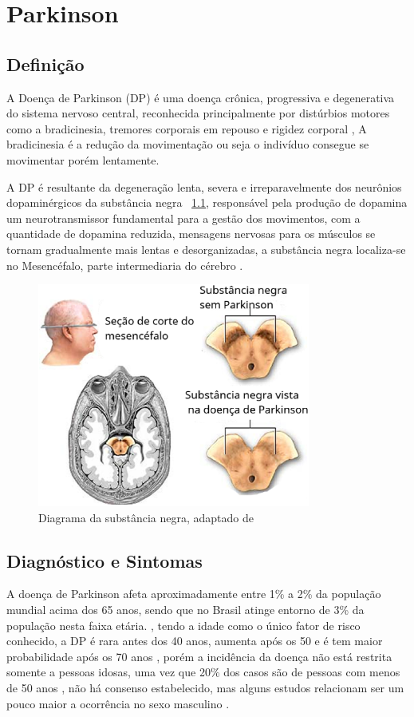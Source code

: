 \chapter{Parkinson}
\section{Definição}

A Doença de Parkinson (DP) é uma doença crônica, progressiva e degenerativa do sistema nervoso central, reconhecida principalmente por distúrbios motores como a bradicinesia, tremores corporais em repouso e rigidez corporal \cite{da2016aspectos}, A bradicinesia é a redução da movimentação ou seja o indivíduo consegue se movimentar porém lentamente. 

A DP é resultante da degeneração lenta, severa e irreparavelmente dos neurônios dopaminérgicos da substância negra ~\ref{substanciaNegra}, responsável pela produção de dopamina um neurotransmissor fundamental para a gestão dos movimentos, com a quantidade de dopamina reduzida, mensagens nervosas para os músculos se tornam gradualmente mais lentas e desorganizadas, a substância negra localiza-se no Mesencéfalo, parte intermediaria do cérebro \cite{eftaxias2015detection}.

\begin{figure}[!htb]
	\centering
	\includegraphics[width=0.8\textwidth]{figuras/subNegra.eps}
	\caption{Diagrama da substância negra, adaptado de }
	\label{substanciaNegra}
\end{figure}

\section{Diagnóstico e Sintomas}
A doença de Parkinson afeta aproximadamente entre 1\% a 2\% da população mundial acima dos 65 anos, sendo que no Brasil atinge entorno de 3\% da população nesta faixa etária. \cite{magalhaes2009descobrindo}, tendo a idade como o único fator de risco conhecido, a DP é rara antes dos 40 anos, aumenta após os 50 e é tem maior probabilidade após os 70 anos \cite{peixinho2006alteraccoes}, porém a incidência da doença não está restrita somente a pessoas idosas, uma vez que 20\% dos casos são de pessoas com menos de 50 anos \cite{gago2014manual}, não há consenso estabelecido, mas alguns estudos relacionam ser um pouco maior a ocorrência no sexo masculino \cite{peixinho2006alteraccoes}.

